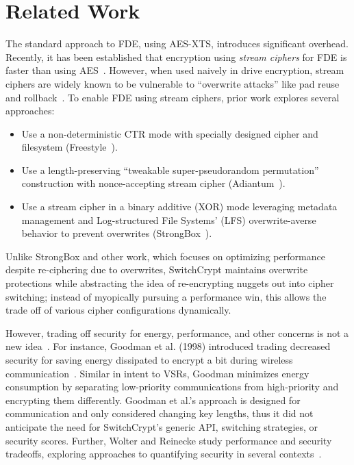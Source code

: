 \section{Related Work}\label{sec:related}

The standard approach to FDE, using AES-XTS, introduces significant overhead.
Recently, it has been established that encryption using \emph{stream ciphers}
for FDE is faster than using AES~\cite{StrongBox, AnotherPaper1, AnotherPaper2}.
However, when used naively in drive encryption, stream ciphers are widely known
to be vulnerable to ``overwrite attacks'' like pad reuse and
rollback~\cite{KatzLindell, StrongBox}. To enable FDE using stream ciphers,
prior work explores several approaches:

\begin{itemize}
   \item Use a non-deterministic CTR mode with specially designed cipher and
   filesystem (Freestyle~\cite{Freestyle}).
   \item Use a length-preserving ``tweakable super-pseudorandom permutation''
   construction with nonce-accepting stream cipher (Adiantum~\cite{Adiantum}).
   \item Use a stream cipher in a binary additive (XOR) mode leveraging metadata
   management and Log-structured File Systems' (LFS) overwrite-averse behavior
   to prevent overwrites (StrongBox~\cite{StrongBox}).
\end{itemize}

Unlike StrongBox and other work, which focuses on optimizing performance despite
re-ciphering due to overwrites, SwitchCrypt maintains overwrite protections
while abstracting the idea of re-encrypting nuggets out into cipher switching;
instead of myopically pursuing a performance win, this allows the trade off of
various cipher configurations dynamically.

However, trading off security for energy, performance, and other concerns is not
a new idea~\cite{ScalableSecurity, WolterReinecke, ZengChow1, ZengChow2,
HaleemEtAl, LiOmiecinski}. For instance, Goodman et al. (1998) introduced
trading decreased security for saving energy dissipated to encrypt a bit during
wireless communication~\cite{ScalableSecurity}. Similar in intent to VSRs,
Goodman minimizes energy consumption by separating low-priority communications
from high-priority and encrypting them differently. Goodman et al.'s approach is
designed for communication and only considered changing key lengths, thus it did
not anticipate the need for SwitchCrypt's generic API, switching strategies, or
security scores. Further, Wolter and Reinecke study performance and security
tradeoffs, exploring approaches to quantifying security in several
contexts~\cite{WolterReinecke}. 

